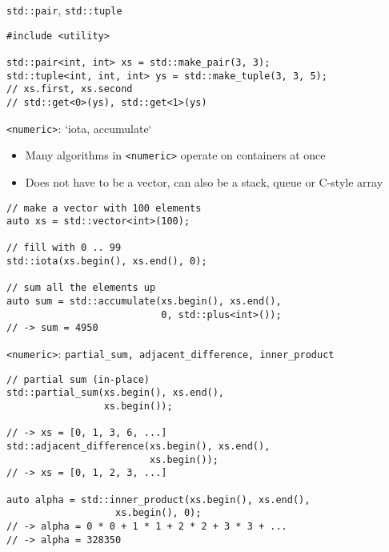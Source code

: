 \documentclass[10pt]{beamer}
\begin{document}
\begin{frame}[fragile,label={sec:orge8f087a}]{\texttt{std::pair}, \texttt{std::tuple}}
 \begin{verbatim}
#include <utility>

std::pair<int, int> xs = std::make_pair(3, 3);
std::tuple<int, int, int> ys = std::make_tuple(3, 3, 5);
// xs.first, xs.second
// std::get<0>(ys), std::get<1>(ys)
\end{verbatim}
\end{frame}

\begin{frame}[fragile,label={sec:orge0a586b}]{\texttt{<numeric>}: `iota, accumulate`}
 \begin{itemize}
\item Many algorithms in \texttt{<numeric>} operate on containers at once
\item Does not have to be a vector, can also be a stack, queue or C-style array
\end{itemize}

\begin{verbatim}
// make a vector with 100 elements
auto xs = std::vector<int>(100);

// fill with 0 .. 99
std::iota(xs.begin(), xs.end(), 0);

// sum all the elements up
auto sum = std::accumulate(xs.begin(), xs.end(),
                           0, std::plus<int>());
// -> sum = 4950
\end{verbatim}
\end{frame}

\begin{frame}[fragile,label={sec:orgb7f5514}]{\texttt{<numeric>}: \texttt{partial\_sum, adjacent\_difference, inner\_product}}
 \begin{verbatim}
// partial sum (in-place)
std::partial_sum(xs.begin(), xs.end(),
                 xs.begin());

// -> xs = [0, 1, 3, 6, ...]
std::adjacent_difference(xs.begin(), xs.end(),
                         xs.begin());
// -> xs = [0, 1, 2, 3, ...]

auto alpha = std::inner_product(xs.begin(), xs.end(),
                   xs.begin(), 0);
// -> alpha = 0 * 0 + 1 * 1 + 2 * 2 + 3 * 3 + ...
// -> alpha = 328350
\end{verbatim}
\end{frame}
\end{document}
